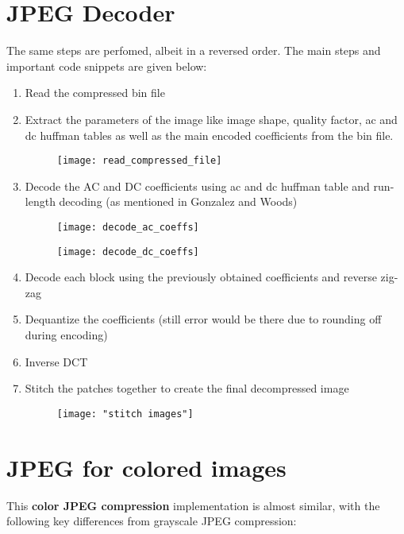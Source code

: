 \documentclass[12pt, a4paper]{report}
\begin{document}
	\section{JPEG Decoder}
	The same steps are perfomed, albeit in a reversed order. The main steps and important code snippets are given below:
	\begin{enumerate}
		\item Read the compressed bin file
		\item Extract the parameters of the image like image shape, quality factor, ac and dc huffman tables as well as the main encoded coefficients from the bin file.
		\begin{figure}[H]
			\centering
			\texttt{[image: read\_compressed\_file]}
			\caption[read compressed file]{}
			\label{fig:readcompressedfile}
		\end{figure}
		
		\item Decode the AC and DC coefficients using ac and dc huffman table and run-length decoding (as mentioned in Gonzalez and Woods)
		\begin{figure}[H]
			\centering
			\texttt{[image: decode\_ac\_coeffs]}
			\caption[decode ac coefficients]{}
			\label{fig:decodeaccoeffs}
		\end{figure}
		\begin{figure}[H]
			\centering
			\texttt{[image: decode\_dc\_coeffs]}
			\caption[decode dc coefficients]{}
			\label{fig:decodedccoeffs}
		\end{figure}
		\item Decode each block using the previously obtained coefficients and reverse zig-zag
		\item Dequantize the coefficients (still error would be there due to rounding off during encoding)
		\item Inverse DCT
		\item Stitch the patches together to create the final decompressed image
		\begin{figure}[H]
			\centering
			\texttt{[image: "stitch images"]}
			\caption[stitch images]{}
			\label{fig:stitch-images}
		\end{figure}
	\end{enumerate}
	
	\section{JPEG for colored images}
	This \textbf{color JPEG compression} implementation is almost similar, with the following key differences from grayscale JPEG compression:
	
\end{document}
